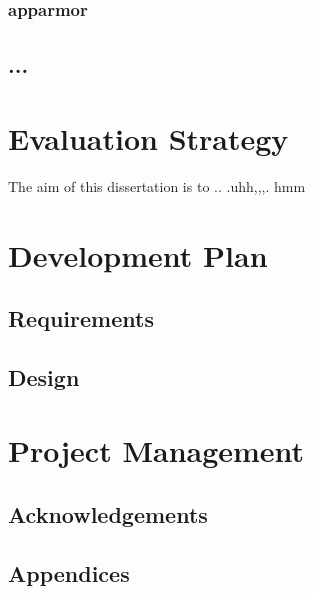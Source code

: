 \documentclass[a4paper,11pt]{report}
\begin{document}
\subsection{apparmor}

\section{...}


\chapter{Evaluation Strategy}
The aim of this dissertation is to .. .uhh,,,. hmm

\chapter{Development Plan}

\section{Requirements}

\section{Design}


\chapter{Project Management}

{}


\section*{Acknowledgements}

\section*{Appendices}
\end{document}
